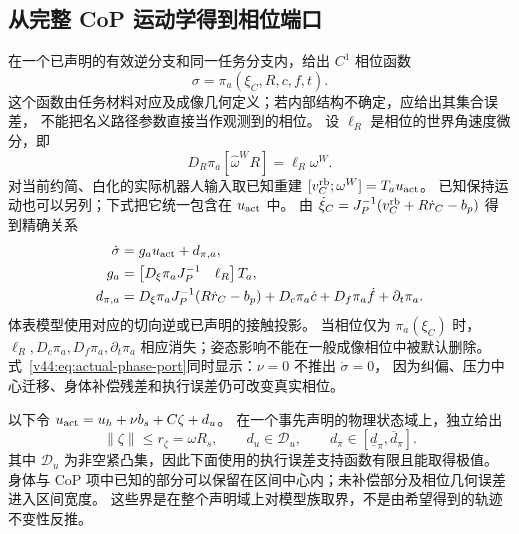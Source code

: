 \documentclass[11pt,a4paper]{article}
\numberwithin{equation}{section}
\theoremstyle{definition}
\begin{document}
\subsection{从完整 CoP 运动学得到相位端口}
在一个已声明的有效逆分支和同一任务分支内，给出 $C^1$ 相位函数
\begin{equation}
 \sigma=\pi_a(\xi_C,R,c,f,t).
 \label{v44:eq:physical-phase-map}
\end{equation}
这个函数由任务材料对应及成像几何定义；若内部结构不确定，应给出其集合误差，
不能把名义路径参数直接当作观测到的相位。
设 $\ell_R$ 是相位的世界角速度微分，即
\begin{equation}
 D_R\pi_a[\widehat\omega^{W}R]=\ell_R\omega^{W}.
\end{equation}
对当前约简、白化的实际机器人输入取已知重建
$[v_C^{\rm rb};\omega^{W}]=T_a u_{\rm act}$。
已知保持运动也可以另列；下式把它统一包含在 $u_{\rm act}$ 中。
由 $\dot\xi_C=J_P^{-1}(v_C^{\rm rb}+R\dot r_C-b_p)$ 得到精确关系
\begin{align}
 \dot\sigma&=g_a u_{\rm act}+d_{\pi,a},
 \label{v44:eq:actual-phase-port}\\
 g_a&=\begin{bmatrix}D_\xi\pi_a J_P^{-1}&\ell_R\end{bmatrix}T_a,\\
 d_{\pi,a}
 &=D_\xi\pi_a J_P^{-1}(R\dot r_C-b_p)
   +D_c\pi_a\dot c+D_f\pi_a\dot f+\partial_t\pi_a.
 \label{v44:eq:actual-phase-drift}
\end{align}
体表模型使用对应的切向逆或已声明的接触投影。
当相位仅为 $\pi_a(\xi_C)$ 时，$\ell_R,D_c\pi_a,D_f\pi_a,\partial_t\pi_a$
相应消失；姿态影响不能在一般成像相位中被默认删除。
式~\eqref{v44:eq:actual-phase-port}同时显示：$\nu=0$ 不推出 $\dot\sigma=0$，
因为纠偏、压力中心迁移、身体补偿残差和执行误差仍可改变真实相位。

以下令 $u_{\rm act}=u_h+\nu b_s+C\zeta+d_u$。
在一个事先声明的物理状态域上，独立给出
\begin{equation}
 \|\zeta\|\le r_\zeta=\omega R_s,\qquad
 d_u\in\mathcal D_u,\qquad
 d_\pi\in[\underline d_\pi,\overline d_\pi].
 \label{v44:eq:phase-uncertainty-contract}
\end{equation}
其中 $\mathcal D_u$ 为非空紧凸集，因此下面使用的执行误差支持函数有限且能取得极值。
身体与 CoP 项中已知的部分可以保留在区间中心内；未补偿部分及相位几何误差进入区间宽度。
这些界是在整个声明域上对模型族取界，不是由希望得到的轨迹不变性反推。
\end{document}
